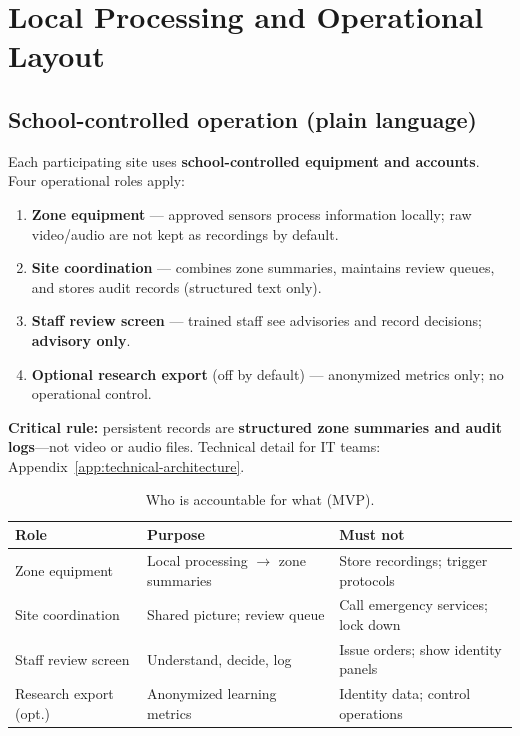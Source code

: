 \section{Local Processing and Operational Layout}
\label{sec:deployment-infrastructure}
\label{sec:hardware-requirements}
\label{sec:edge-infrastructure-req}
\label{sec:network-requirements}

\subsection{School-controlled operation (plain language)}

Each participating site uses \textbf{school-controlled equipment and accounts}.
Four operational roles apply:

\begin{enumerate}[noitemsep]
  \item \textbf{Zone equipment} --- approved sensors process information locally; raw video/audio
        are not kept as recordings by default.
  \item \textbf{Site coordination} --- combines zone summaries, maintains review queues, and stores
        audit records (structured text only).
  \item \textbf{Staff review screen} --- trained staff see advisories and record decisions;
        \textbf{advisory only}.
  \item \textbf{Optional research export} (off by default) --- anonymized metrics only; no operational control.
\end{enumerate}

\textbf{Critical rule:} persistent records are \textbf{structured zone summaries and audit logs}---not
video or audio files.
Technical detail for IT teams: Appendix~\ref{app:technical-architecture}.

\begin{table}[htbp]
  \centering
  \caption{Who is accountable for what (MVP).}
  \label{tab:deployment-roles}
  \small
  \begin{tabular}{@{}p{2.8cm}p{5.0cm}p{4.2cm}@{}}
    \toprule
    Role & Purpose & Must not \\
    \midrule
    Zone equipment &
      Local processing $\rightarrow$ zone summaries &
      Store recordings; trigger protocols \\
    Site coordination &
      Shared picture; review queue &
      Call emergency services; lock down \\
    Staff review screen &
      Understand, decide, log &
      Issue orders; show identity panels \\
    Research export (opt.) &
      Anonymized learning metrics &
      Identity data; control operations \\
    \bottomrule
  \end{tabular}
\end{table}

